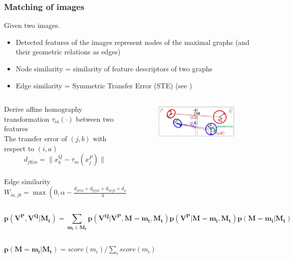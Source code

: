 \documentclass[hyperref={pdfpagelabels=false}]{beamer}
\begin{document}
\begin{frame}[allowframebreaks]
\frametitle{Matching of images}
Given two images.
\begin{itemize}
\item Detected features of the images represent nodes of the maximal graphs (and their geometric relations as edges)
\item Node similarity  = similarity of feature descriptors of two graphs
\item Edge similarity = Symmetric Transfer Error (STE) (see \cite{MinsuChoRRW})
\end{itemize}

\begin{columns}[T]
\fontsize{10pt}{6}\selectfont
	\begin{column}{0.6\textwidth}
		Derive affine homography transformation $\tau_{ia}(\cdot)$ between two features\\
		\vspace{10pt}
		The transfer error of $(j,b)$ with respect to $(i,a)$
		$$d_{jb|ia}=\|x_b^Q-\tau_{ia}(x_j^P)\|$$\\
		Edge similarity $W_{ia,jb} = \max(0, \alpha - \frac{d_{jb|ia}+d_{bj|ai}+d_{ia|jb}+d_{ai|jb}}{4} )$
	\end{column}
	\begin{column}{0.4\textwidth}
		\begin{figure}
			\includegraphics[scale=0.5]{fig4.png}
		\end{figure}
	\end{column}
\end{columns}
	

\framebreak

\fontsize{7pt}{6}\selectfont

$$ \mathbf{p(V^P,V^Q|M_t) = \sum_{m_i\in M_t}p(V^Q|V^P,M=m_i,M_t)p(V^P|M=m_i, M_t)p(M=m_i|M_t)}$$

\begin{itemize}
  \begin{columns}[T]
    \begin{column}{0.75\textwidth}
	\item $\mathbf{p(M=m_i|M_t)} = score(m_i)/\sum_i score(m_i)$\\
    \end{column}
    

\end{columns}
\end{itemize}
\end{frame}
\end{document}
